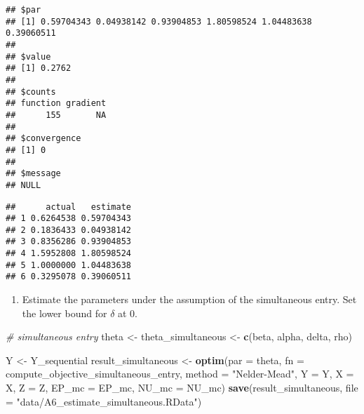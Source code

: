 \documentclass[
]{book}
\newenvironment{Shaded}{\begin{snugshade}}{\end{snugshade}}
\newcommand{\CommentTok}[1]{\textcolor[rgb]{0.56,0.35,0.01}{\textit{#1}}}
\newcommand{\DataTypeTok}[1]{\textcolor[rgb]{0.13,0.29,0.53}{#1}}
\newcommand{\KeywordTok}[1]{\textcolor[rgb]{0.13,0.29,0.53}{\textbf{#1}}}
\newcommand{\NormalTok}[1]{#1}
\newcommand{\OperatorTok}[1]{\textcolor[rgb]{0.81,0.36,0.00}{\textbf{#1}}}
\newcommand{\StringTok}[1]{\textcolor[rgb]{0.31,0.60,0.02}{#1}}
\providecommand{\tightlist}{%
  \setlength{\itemsep}{0pt}\setlength{\parskip}{0pt}}
\begin{document}
\begin{verbatim}
## $par
## [1] 0.59704343 0.04938142 0.93904853 1.80598524 1.04483638 0.39060511
## 
## $value
## [1] 0.2762
## 
## $counts
## function gradient 
##      155       NA 
## 
## $convergence
## [1] 0
## 
## $message
## NULL
\end{verbatim}

\begin{Shaded}
\end{Shaded}

\begin{verbatim}
##      actual   estimate
## 1 0.6264538 0.59704343
## 2 0.1836433 0.04938142
## 3 0.8356286 0.93904853
## 4 1.5952808 1.80598524
## 5 1.0000000 1.04483638
## 6 0.3295078 0.39060511
\end{verbatim}

\begin{enumerate}
\def\labelenumi{\arabic{enumi}.}
\setcounter{enumi}{6}
\tightlist
\item
  Estimate the parameters under the assumption of the simultaneous entry. Set the lower bound for \(\delta\) at 0.
\end{enumerate}

\begin{Shaded}
\begin{Highlighting}[]
\CommentTok{# simultaneous entry}
\NormalTok{theta <-}\StringTok{ }\NormalTok{theta_simultaneous <-}
\StringTok{  }\KeywordTok{c}\NormalTok{(beta, alpha, delta, rho)}
\end{Highlighting}
\end{Shaded}

\begin{Shaded}
\begin{Highlighting}[]
\NormalTok{Y <-}\StringTok{ }\NormalTok{Y_sequential}
\NormalTok{result_simultaneous <-}
\StringTok{  }\KeywordTok{optim}\NormalTok{(}\DataTypeTok{par =}\NormalTok{ theta,}
        \DataTypeTok{fn =}\NormalTok{ compute_objective_simultaneous_entry,}
        \DataTypeTok{method =} \StringTok{"Nelder-Mead"}\NormalTok{,}
        \DataTypeTok{Y =}\NormalTok{ Y,}
        \DataTypeTok{X =}\NormalTok{ X,}
        \DataTypeTok{Z =}\NormalTok{ Z,}
        \DataTypeTok{EP_mc =}\NormalTok{ EP_mc,}
        \DataTypeTok{NU_mc =}\NormalTok{ NU_mc)}
\KeywordTok{save}\NormalTok{(result_simultaneous, }\DataTypeTok{file =} \StringTok{"data/A6_estimate_simultaneous.RData"}\NormalTok{)}
\end{Highlighting}
\end{Shaded}
\end{document}
